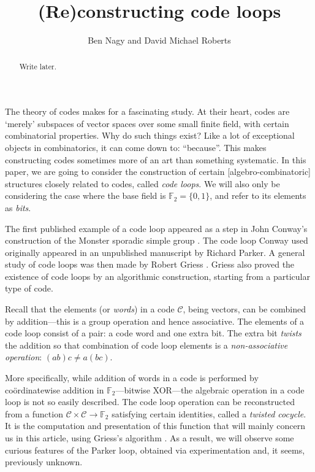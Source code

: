 \documentclass{article}
\theoremstyle{plain}
\theoremstyle{definition}
\def \cC {\mathcal{C}}
\def \FF {\mathbb{F}}
\begin{document}
\title{(Re)constructing code loops}
\author{Ben Nagy and David Michael Roberts}

\maketitle

\begin{abstract}
Write later.
\end{abstract}


\noindent
The theory of codes makes for a fascinating study. 
At their heart, codes are `merely' subspaces of vector spaces over some small finite field, with certain combinatorial properties.
Why do such things exist? Like a lot of exceptional objects in combinatorics, it can come down to: ``because''.
This makes constructing codes sometimes more of an art than something systematic.
In this paper, we are going to consider the construction of certain [algebro-combinatoric] structures closely related to codes, called \emph{code loops}. 
We will also only be considering the case where the base field is $\FF_2=\{0,1\}$, and refer to its elements as \emph{bits}.

The first published example of a code loop appeared as a step in John Conway's construction of the Monster sporadic simple group \cite{Conway}. 
The code loop Conway used originally appeared in an unpublished manuscript by Richard Parker.
A general study of code loops was then made by Robert Griess \cite{Griess}.
Griess also proved the existence of code loops by an algorithmic construction, starting from a particular type of code.

Recall that the elements (or \emph{words}) in a code $\cC$, being vectors, can be combined by addition---this is a group operation and hence associative. 
The elements of a code loop consist of a pair: a code word and one extra bit.
The extra bit \emph{twists} the addition so that combination of code loop elements is a \emph{non-associative operation}: $(ab)c\not=a(bc)$.

More specifically, while addition of words in a code is performed by co\"ordinatewise addition in $\FF_2$---bitwise XOR---the algebraic operation in a code loop is not so easily described.
The code loop operation can be reconstructed from a function $\cC \times \cC \to \FF_2$ satisfying certain identities, called a \emph{twisted cocycle}.
It is the computation and presentation of this function that will mainly concern us in this article, using Griess's algorithm \cite[proof of Theorem 10]{Griess}.
As a result, we will observe some curious features of the Parker loop, obtained via experimentation and, it seems, previously unknown.
\end{document}
